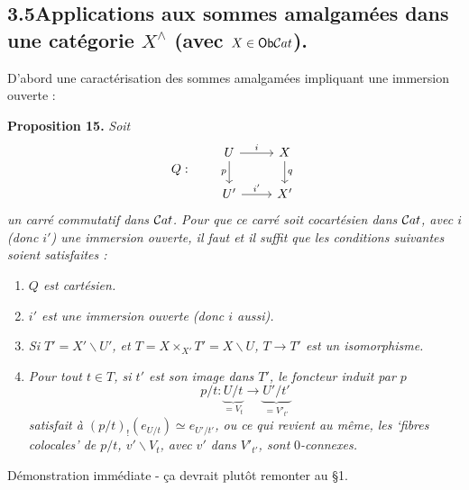 \subsection*{3.5\quad Applications aux sommes amalgamées dans une catégorie $X^{\wedge}$ (avec $X \in \mathsf{Ob} \mathcal{C}at$).}

D'abord une caractérisation des sommes amalgamées impliquant une immersion ouverte :

\textbf{Proposition 15.} \textit{Soit}
\[
Q : \qquad
\begin{tikzcd}
U \ar[r, "i"] \ar[d, "p"'] & X \ar[d, "q"] \\
U' \ar[r, "i'"] & X'
\end{tikzcd}
\]
\textit{un carré commutatif dans} $\mathcal{C}at$\textit{. Pour que ce carré soit cocartésien dans} $\mathcal{C}at$\textit{, avec $i$ (donc $i'$) une immersion ouverte, il faut et il suffit que les conditions suivantes soient satisfaites :}

\begin{enumerate}[label={}, leftmargin=2.5em]
\item[\textit{a)}] \textit{$Q$ est cartésien.}
\item[\textit{b)}] \textit{$i'$ est une immersion ouverte (donc $i$ aussi).}
\item[\textit{c)}] \textit{Si $T' = X' \backslash U'$, et $T = X \times_{X'} T' = X \backslash U$, $T \longrightarrow T'$ est un isomorphisme.}
\item[\textit{d)}] \textit{Pour tout $t \in T$, si $t'$ est son image dans $T'$, le foncteur induit par $p$}
\[
p/t : \underbrace{U/t}_{= V_t} \longrightarrow \underbrace{U'/t'}_{= V'_{t'}}
\]
\textit{satisfait à $(p/t)_!(e_{U/t}) \simeq e_{U'/t'}$, ou ce qui revient au même, les `fibres colocales' de $p/t$, $v' \backslash V_t$, avec $v'$ dans $V'_{t'}$, sont} $0$\textit{-connexes.}
\end{enumerate}

Démonstration immédiate - ça devrait plutôt remonter au §1.

